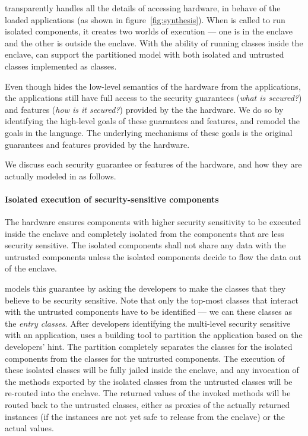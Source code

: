 \sysname{} transparently handles all the details of accessing \sgx{} hardware,
in behave of the loaded \java{} applications (as shown in figure~\ref{fig:synthesis}).
When \sysname{} is called to run isolated \java{} components,
it creates two worlds of \java{} execution --- one is in the enclave and the other is outside the enclave.
With the ability of running \java{} classes inside the enclave,
\sysname{} can support the partitioned model with both isolated and untrusted classes implemented as \java{} classes.



Even though \sysname{} hides the low-level semantics of the \sgx{} hardware from the applications,
the applications still have full access to the security guarantees ({\em what is secured?}) and features ({\em how is it secured?}) provided by the the \sgx{} hardware.
We do so by identifying the high-level goals of these guarantees and features,
and remodel the goals in the \java{} language.
The underlying mechanisms of these goals is the original guarantees and features provided by the \sgx{} hardware.

We discuss each security guarantee or features of the \sgx{} hardware,
and how they are actually modeled in \sysname{} as follows.

\paragraph{Isolated execution of security-sensitive components}
The \sgx{} hardware ensures components with higher security sensitivity
to be executed inside the enclave
and completely isolated from the components that are less security sensitive.
The isolated components shall not share any data with the untrusted components unless the isolated components decide
to flow the data out of the enclave.  

\sysname{} models this guarantee by asking the developers to make
the classes that they believe to be security sensitive.
Note that only the top-most classes that interact with the untrusted components have to be identified --- we can these classes as the {\em entry classes}.
After developers identifying the multi-level security sensitive with an application, \sysname{} uses a building tool to partition the application
based on the developers' hint.
The partition completely separates the \java{} classes for the isolated components from the classes for the untrusted components.
The execution of these isolated classes will be fully jailed inside the enclave, and any invocation of the methods exported by the isolated classes
from the untrusted classes
will be re-routed into the enclave.
The returned values of the invoked methods will be routed back to
the untrusted classes,
either as proxies of the actually returned instances (if the instances are not yet safe to release from the enclave) or the actual values.

